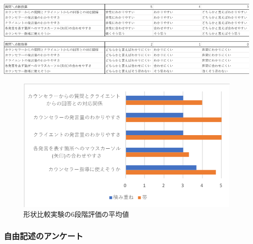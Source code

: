 \documentclass[shuuron]{kuee}
\begin{document}
\begin{table}
  \caption{Three life task based on Adler psychology.}
  \label{table:keijouAnketo}
  \begin{center}
    \includegraphics[width=\linewidth]{point.png}
\end{center}
\end{table}

\begin{figure}
  \begin{center}
    \includegraphics[width=\linewidth]{keijouAnketo.png}
  \end{center}
  \caption{形状比較実験の6段階評価の平均値}
  \label{fig:keijouAnketo}
\end{figure}


\subsubsection{自由記述のアンケート}
\end{document}
